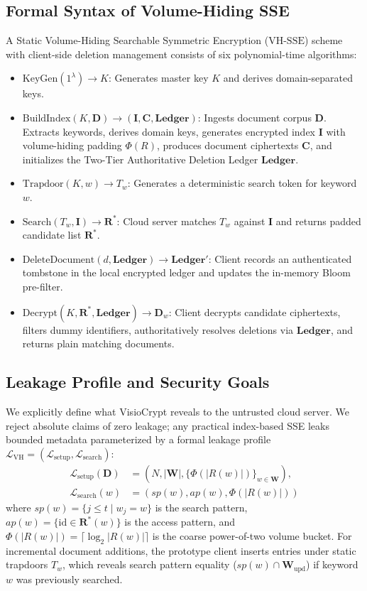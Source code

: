 \documentclass[10pt,conference]{IEEEtran}
\newenvironment{revised}{\color{revcolor}}{}
\newenvironment{revised}{\color{revcolor}}{}
\begin{document}
\begin{revised}
\subsection{Formal Syntax of Volume-Hiding SSE}
A Static Volume-Hiding Searchable Symmetric Encryption ($\text{VH-SSE}$) scheme with client-side deletion management consists of six polynomial-time algorithms:
\begin{itemize}
    \item $\text{KeyGen}(1^\lambda) \to K$: Generates master key $K$ and derives domain-separated keys.
    \item $\text{BuildIndex}(K, \mathbf{D}) \to (\mathbf{I}, \mathbf{C}, \mathbf{Ledger})$: Ingests document corpus $\mathbf{D}$. Extracts keywords, derives domain keys, generates encrypted index $\mathbf{I}$ with volume-hiding padding $\Phi(R)$, produces document ciphertexts $\mathbf{C}$, and initializes the Two-Tier Authoritative Deletion Ledger $\mathbf{Ledger}$.
    \item $\text{Trapdoor}(K, w) \to T_w$: Generates a deterministic search token for keyword $w$.
    \item $\text{Search}(T_w, \mathbf{I}) \to \mathbf{R}^*$: Cloud server matches $T_w$ against $\mathbf{I}$ and returns padded candidate list $\mathbf{R}^*$.
    \item $\text{DeleteDocument}(d, \mathbf{Ledger}) \to \mathbf{Ledger}'$: Client records an authenticated tombstone in the local encrypted ledger and updates the in-memory Bloom pre-filter.
    \item $\text{Decrypt}(K, \mathbf{R}^*, \mathbf{Ledger}) \to \mathbf{D}_w$: Client decrypts candidate ciphertexts, filters dummy identifiers, authoritatively resolves deletions via $\mathbf{Ledger}$, and returns plain matching documents.
\end{itemize}

\subsection{Leakage Profile and Security Goals}
We explicitly define what VisioCrypt reveals to the untrusted cloud server. We reject absolute claims of zero leakage; any practical index-based SSE leaks bounded metadata parameterized by a formal leakage profile $\mathcal{L}_{\text{VH}} = (\mathcal{L}_{\text{setup}}, \mathcal{L}_{\text{search}})$:
\begin{align}
\mathcal{L}_{\text{setup}}(\mathbf{D}) &= \left(N, |\mathbf{W}|, \{\Phi(|R(w)|)\}_{w \in \mathbf{W}}\right), \\
\mathcal{L}_{\text{search}}(w) &= \left(sp(w), ap(w), \Phi(|R(w)|)\right)
\end{align}
where $sp(w) = \{ j \le t \mid w_j = w \}$ is the search pattern, $ap(w) = \{ \text{id} \in \mathbf{R}^*(w) \}$ is the access pattern, and $\Phi(|R(w)|) = \lceil \log_2 |R(w)| \rceil$ is the coarse power-of-two volume bucket. For incremental document additions, the prototype client inserts entries under static trapdoors $T_w$, which reveals search pattern equality ($sp(w) \cap \mathbf{W}_{\text{upd}}$) if keyword $w$ was previously searched.


\end{revised}
\end{document}
